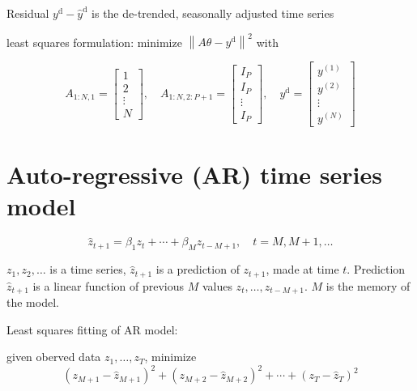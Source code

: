 \begin{definition}
    Residual $ y^{\mathrm{d}}-\hat{y}^{\mathrm{d}} $ is the de-trended, seasonally adjusted time series
\end{definition}

\begin{problem}
    least squares formulation: minimize $ \left\|A \theta-y^{\mathrm{d}}\right\|^{2} $ with

$$ A_{1: N, 1}=\left[\begin{array}{c}1 \\ 2 \\ \vdots \\ N\end{array}\right], \quad A_{1: N, 2: P+1}=\left[\begin{array}{c}I_{P} \\ I_{P} \\ \vdots \\ I_{P}\end{array}\right], \quad y^{\mathrm{d}}=\left[\begin{array}{c}y^{(1)} \\ y^{(2)} \\ \vdots \\ y^{(N)}\end{array}\right] $$
\end{problem}



\section{Auto-regressive (AR) time series model}

\begin{problem}
    $$
\hat{z}_{t+1}=\beta_{1} z_{t}+\cdots+\beta_{M} z_{t-M+1}, \quad t=M, M+1, \ldots
$$

$ z_{1}, z_{2}, \ldots $ is a time series, $ \hat{z}_{t+1} $ is a prediction of $ z_{t+1} $, made at time $ t $. Prediction $ \hat{z}_{t+1} $ is a linear function of previous $ M $ values $ z_{t}, \ldots, z_{t-M+1} $. $ M $ is the memory of the model.
\end{problem}

\begin{problem}
    Least squares fitting of AR model: 
    
    given oberved data $ z_{1}, \ldots, z_{T} $, minimize
$$
\left(z_{M+1}-\hat{z}_{M+1}\right)^{2}+\left(z_{M+2}-\hat{z}_{M+2}\right)^{2}+\cdots+\left(z_{T}-\hat{z}_{T}\right)^{2}
$$
\end{problem}



